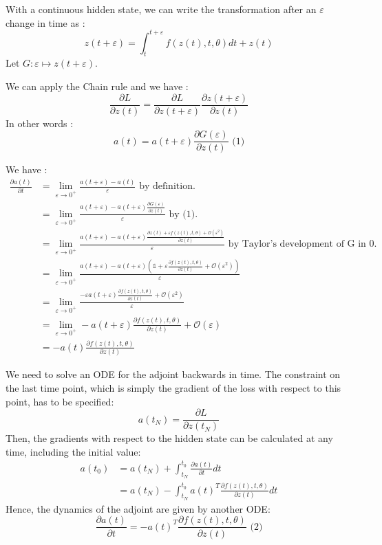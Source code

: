 \documentclass[10pt,a4paper]{article}
\theoremstyle{definition}
\theoremstyle{definition}
\begin{document}
With a continuous hidden state, we can write the transformation after an $\varepsilon$ change in time as :
$$
z(t+\varepsilon) = \int^{t+\varepsilon}_{t} f(z(t),t,\theta) dt + z(t)
$$
Let $ G : \varepsilon \mapsto z(t+\varepsilon)$.

We can apply the Chain rule and we have :
$$
\frac{\partial L}{\partial z(t)} = \frac{\partial L}{\partial z(t+\varepsilon)} \frac{\partial z(t+\varepsilon)}{\partial z(t)}
$$
In other words :
$$
a(t) = a(t+\varepsilon)\frac{\partial G(\varepsilon)}{\partial z(t)} \text{   (1)}
$$

We have :
\begin{align*}
\frac{\partial a(t)}{\partial t} &= \lim_{\varepsilon \rightarrow 0^+} \frac{a(t+\varepsilon) - a(t)}{\varepsilon} \text{ by definition.}\\
&= \lim_{\varepsilon \rightarrow 0^+} \frac{a(t+\varepsilon) - a(t+\varepsilon)\frac{\partial G(\varepsilon)}{\partial z(t)}}{\varepsilon} \text{ by (1).}\\
&= \lim_{\varepsilon \rightarrow 0^+} \frac{a(t+\varepsilon) - a(t+\varepsilon)\frac{\partial z(t) + \varepsilon f(z(t),t,\theta) + \mathcal{O}(\varepsilon^2)}{\partial z(t)}}{\varepsilon} \text{ by Taylor's development of G in 0.} \\
&= \lim_{\varepsilon \rightarrow 0^+} \frac{a(t+\varepsilon) - a(t+\varepsilon)(\mathbb{1} + \varepsilon \frac{\partial f(z(t),t,\theta)} {\partial z(t)}+ \mathcal{O}(\varepsilon^2))}{\varepsilon}\\
&= \lim_{\varepsilon \rightarrow 0^+} \frac{-\varepsilon a(t+\varepsilon) \frac{\partial f(z(t),t,\theta)} {\partial z(t)}+ \mathcal{O}(\varepsilon^2)}{\varepsilon}\\
&= \lim_{\varepsilon \rightarrow 0^+} - a(t+\varepsilon) \frac{\partial f(z(t),t,\theta)} {\partial z(t)}+ \mathcal{O}(\varepsilon)\\
&= -a(t)\frac{\partial f(z(t),t,\theta)} {\partial z(t)}
\end{align*}
 
We need to solve an ODE for the adjoint backwards in time. The constraint on the last time point, which is simply the gradient of the loss with respect to this point, has to be specified:
$$
a(t_N) = \frac{\partial L}{\partial z(t_N)}
$$
Then, the gradients with respect to the hidden state can be calculated at any time, including the initial value:
\begin{align*}
a(t_0) &= a(t_N) + \int^{t_0}_{t_N} \frac{\partial a(t)}{\partial t} dt\\
&= a(t_N) - \int^{t_0}_{t_N} a(t)^T \frac{\partial f(z(t),t,\theta)} {\partial z(t)} dt
\end{align*}
Hence, the dynamics of the adjoint are given by another ODE:
$$
\frac{\partial a(t)}{\partial t} = -a(t)^T \frac{\partial f(z(t),t,\theta)} {\partial z(t)} \text{ (2)}
$$
\end{document}
